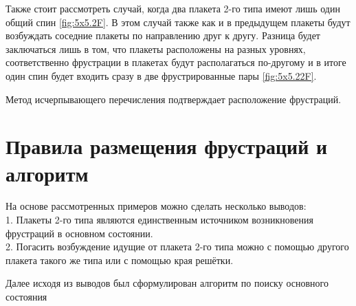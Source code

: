 \documentclass[utf8, babel, sor, jor, amsmath, amssymb, reprint]{elsarticle} %
\begin{document}
Также стоит рассмотреть случай, когда два плакета 2-го типа имеют лишь один общий спин \ref{fig:5x5.2F}.
В этом случай также как и в предыдущем плакеты будут возбуждать соседние плакеты по направлению друг к другу. Разница будет заключаться лишь в том, что плакеты расположены на разных уровнях, соответственно фрустрации в плакетах будут располагаться по-другому и в итоге один спин будет входить сразу в две фрустрированные пары \ref{fig:5x5.22F}.

Метод исчерпывающего перечисления подтверждает расположение фрустраций.

\section{Правила размещения фрустраций и алгоритм}

На основе рассмотренных примеров можно сделать несколько выводов: \\
1. Плакеты 2-го типа являются единственным источником возникновения фрустраций в основном состоянии.\\
2. Погасить возбуждение идущие от плакета 2-го типа можно с помощью другого плакета такого же типа или с помощью края решётки.

Далее исходя из выводов был сформулирован алгоритм по поиску основного состояния
\end{document}
